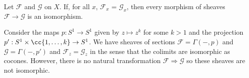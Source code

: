 \documentclass{article}
\begin{document}
\begin{theorem}
  Let $\mathscr F$ and $\mathscr G$ on $X$. If, for all $x$,
  $\mathscr F_x$ = $\mathscr G_x$, then every morphism of sheaves
  $\mathscr F\to\mathscr G$ is an isomorphism.
\end{theorem}

\begin{example}
  Consider the maps $p:S^1\to S^1$ given by $z\mapsto z^k$ for some $k>1$
  and the projection $p':S^1\times\cc{1,\ldots,k}\to S^1$. We have sheaves
  of sections $\mathscr F=\Gamma(-,p)$ and $\mathscr G=\Gamma(-,p')$
  and $\mathscr F_z=\mathscr G_z$ in the sense that the colimits are
  isomorphic as cocones. However, there is no natural transformation
  $\mathscr F\Rightarrow\mathscr G$ so these sheaves are not isomorphic.
\end{example}

\printbibliography{}
\end{document}
